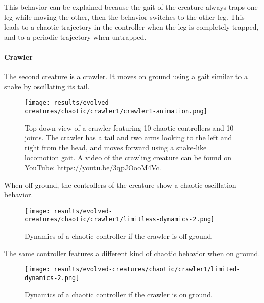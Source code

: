 \documentclass[main]{subfiles}
\begin{document}
This behavior can be explained because the gait of the creature always traps one leg while moving the other, then the behavior switches to the other leg. %
%
This leads to a chaotic trajectory in the controller when the leg is completely trapped, and to a periodic trajectory when untrapped. %

\paragraph{Crawler}

The second creature is a crawler. It moves on ground using a gait similar to a snake by oscillating its tail.

\begin{figure}[H]
\centering
\texttt{[image: results/evolved-creatures/chaotic/crawler1/crawler1-animation.png]}
\caption[Figure of a crawler using chaotic controllers.]{Top-down view of a crawler featuring 10 chaotic controllers and 10 joints. The crawler has a tail and two arms looking to the left and right from the head, and moves forward using a snake-like locomotion gait. A video of the crawling creature can be found on YouTube: \url{https://youtu.be/3qpJOooM4Vc}.}
\label{figure:successfulcreatures-chaotic-crawler1}
\end{figure}

When off ground, the controllers of the creature show a chaotic oscillation behavior. %

\begin{figure}[H]
\centering
\texttt{[image: results/evolved-creatures/chaotic/crawler1/limitless-dynamics-2.png]}
\caption[Off ground controller dynamics of the crawler]{Dynamics of a chaotic controller if the crawler is off ground.}
\label{figure:crawler1-off-ground-controller-dynamics}
\end{figure}

The same controller features a different kind of chaotic behavior when on ground. %

\begin{figure}[H]
\centering
\texttt{[image: results/evolved-creatures/chaotic/crawler1/limited-dynamics-2.png]}
\caption[On ground controller dynamics of the crawler]{Dynamics of a chaotic controller if the crawler is on ground.}
\label{figure:crawler1-on-ground-controller-dynamics}
\end{figure}
\end{document}
